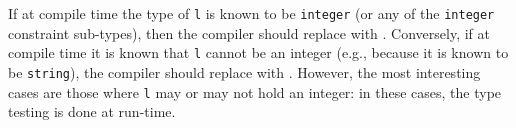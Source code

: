 \documentclass[droidmono,libertine,twoside,user,unofficial]{ecarticle}
\begin{document}
If at compile time the type of \texttt{l} is known to be
\texttt{integer} (or any of the \texttt{integer} constraint
sub-types), then the compiler should replace  with
.  Conversely, if at compile time it is known that
\texttt{l} cannot be an integer (e.g., because it is known to be
\texttt{string}), the compiler should replace  with
.  However, the most interesting cases are those where
\texttt{l} may or may not hold an integer: in these cases, the type
testing is done at run-time.

\end{document}
